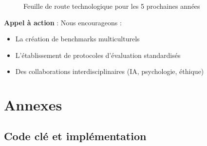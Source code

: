 \documentclass[a4paper,11pt]{article}
\begin{document}
\begin{figure}[h]
\centering
\caption{Feuille de route technologique pour les 5 prochaines années}
\label{fig:roadmap}
\end{figure}

\textbf{Appel à action} : Nous encourageons :
\begin{itemize}
    \item La création de benchmarks multiculturels
    \item L'établissement de protocoles d'évaluation standardisés
    \item Des collaborations interdisciplinaires (IA, psychologie, éthique)
\end{itemize}







































\appendix
\section{Annexes}
\subsection{Code clé et implémentation}
\end{document}

